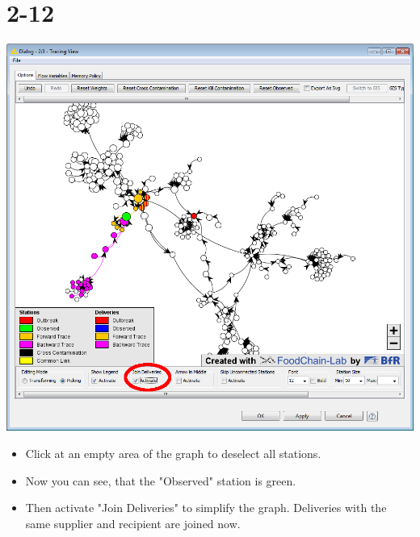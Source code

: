 \documentclass{beamer}
\begin{document}
\section{2-12}
\begin{frame}
	\begin{center}
  		\includegraphics[height=0.6\textheight]{2-12.png}
	\end{center}
	\begin{itemize}
		\item Click at an empty area of the graph to deselect all stations.
		\item Now you can see, that the "Observed" station is green.
		\item Then activate "Join Deliveries" to simplify the graph. Deliveries with the same supplier and recipient are joined now.
	\end{itemize}
\end{frame}
\end{document}

